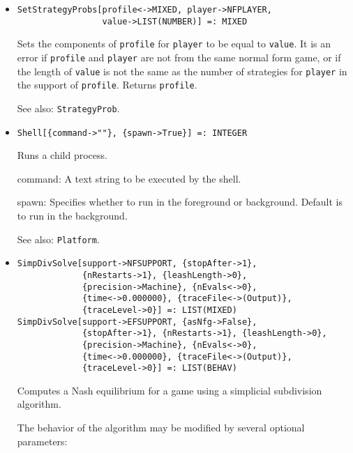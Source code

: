 \begin{itemize}
\item{} 
\protect \large \begin{verbatim}
SetStrategyProbs[profile<->MIXED, player->NFPLAYER, 
                 value->LIST(NUMBER)] =: MIXED 
\end{verbatim} \normalsize

\bd
Sets the components of \verb+profile+ for \verb+player+ to be equal
to \verb+value+.  It is an error if \verb+profile+ and \verb+player+
are not from the same normal form game, or if the length of \verb+value+
is not the same as the number of strategies for \verb+player+ in the
support of \verb+profile+.  Returns \verb+profile+.
\item [See also:] \verb+StrategyProb+.
\ed

\item{}
\protect \large \begin{verbatim}
Shell[{command->""}, {spawn->True}] =: INTEGER 
\end{verbatim} \normalsize

\bd
Runs a child process.  
\bd
\item [command:] A text string to be executed by the shell.  
\item [spawn:] Specifies whether to run in the foreground or
background.  Default is to run in the background.  
\ed
\item [See also:] \verb+Platform+.
\ed

\item{}
\protect \large \begin{verbatim}
SimpDivSolve[support->NFSUPPORT, {stopAfter->1}, 
             {nRestarts->1}, {leashLength->0}, 
             {precision->Machine}, {nEvals<->0}, 
             {time<->0.000000}, {traceFile<->(Output)}, 
             {traceLevel->0}] =: LIST(MIXED) 
SimpDivSolve[support->EFSUPPORT, {asNfg->False}, 
             {stopAfter->1}, {nRestarts->1}, {leashLength->0}, 
             {precision->Machine}, {nEvals<->0}, 
             {time<->0.000000}, {traceFile<->(Output)}, 
             {traceLevel->0}] =: LIST(BEHAV) 
\end{verbatim}\normalsize

\bd
Computes a Nash equilibrium for a game using a simplicial subdivision
algorithm. 

The behavior of the algorithm may be modified by several optional
parameters:


\end{itemize}
